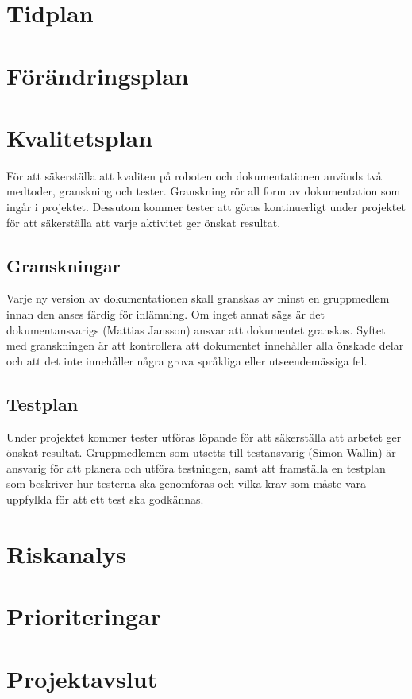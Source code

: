 \documentclass[a4paper,12pt]{article}
\begin{document}
\section{Tidplan}

\section{Förändringsplan}	%

\section{Kvalitetsplan}	%
För att säkerställa att kvaliten på roboten och dokumentationen används två medtoder, granskning och tester. Granskning rör all form av dokumentation som ingår i projektet. Dessutom kommer tester att göras kontinuerligt under projektet för att säkerställa att varje aktivitet ger önskat resultat.
\subsection{Granskningar}
Varje ny version av dokumentationen skall granskas av minst en gruppmedlem innan den anses färdig för inlämning. Om inget annat sägs är det dokumentansvarigs (Mattias Jansson) ansvar att dokumentet granskas. Syftet med granskningen är att kontrollera att dokumentet innehåller alla önskade delar och att det inte innehåller några grova språkliga eller utseendemässiga fel.
\subsection{Testplan}
Under projektet kommer tester utföras löpande för att säkerställa att arbetet ger önskat resultat. Gruppmedlemen som utsetts till testansvarig (Simon Wallin) är ansvarig för att planera och utföra testningen, samt att framställa en testplan som beskriver hur testerna ska genomföras och vilka krav som måste vara uppfyllda för att ett test ska godkännas.


\section{Riskanalys} %

\section{Prioriteringar}


\section{Projektavslut} %
\end{document}
